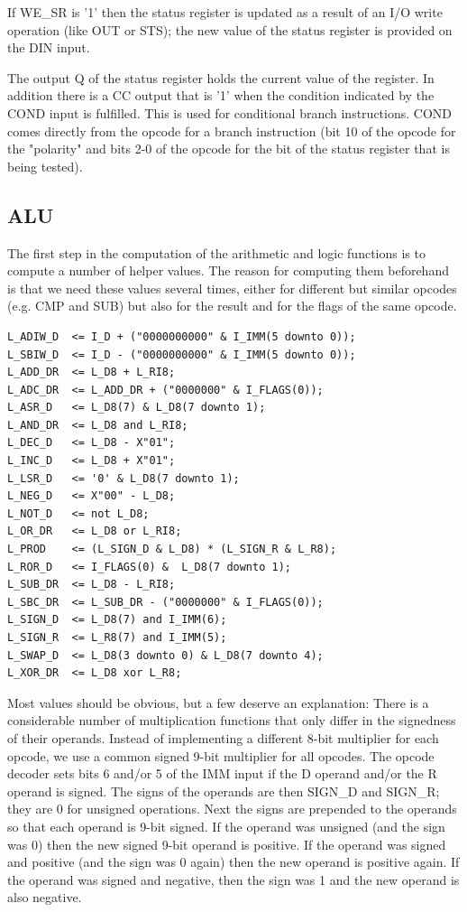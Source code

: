 \documentclass[12pt,a4paper]{report}
\begin{document}
If WE\_SR is '1' then the status register is updated as a result of an I/O write operation (like OUT or STS); the new value of the status register is provided on the DIN input.

The output Q of the status register holds the current value of the register. In addition there is a CC output that is '1' when the condition indicated by the COND input is fulfilled. This is used for conditional branch instructions. COND comes directly from the opcode for a branch instruction (bit 10 of the opcode for the "polarity" and bits 2-0 of the opcode for the bit of the status register that is being tested).
\subsection{ALU}
The first step in the computation of the arithmetic and logic functions is to compute a number of helper values. The reason for computing them beforehand is that we need these values several times, either for different but similar opcodes (e.g. CMP and SUB) but also for the result and for the flags of the same opcode.
\begin{lstlisting}
L_ADIW_D  <= I_D + ("0000000000" & I_IMM(5 downto 0));
L_SBIW_D  <= I_D - ("0000000000" & I_IMM(5 downto 0));
L_ADD_DR  <= L_D8 + L_RI8;
L_ADC_DR  <= L_ADD_DR + ("0000000" & I_FLAGS(0));
L_ASR_D   <= L_D8(7) & L_D8(7 downto 1);
L_AND_DR  <= L_D8 and L_RI8;
L_DEC_D   <= L_D8 - X"01";
L_INC_D   <= L_D8 + X"01";
L_LSR_D   <= '0' & L_D8(7 downto 1);
L_NEG_D   <= X"00" - L_D8;
L_NOT_D   <= not L_D8;
L_OR_DR   <= L_D8 or L_RI8;
L_PROD    <= (L_SIGN_D & L_D8) * (L_SIGN_R & L_R8);
L_ROR_D   <= I_FLAGS(0) &  L_D8(7 downto 1);
L_SUB_DR  <= L_D8 - L_RI8;
L_SBC_DR  <= L_SUB_DR - ("0000000" & I_FLAGS(0));
L_SIGN_D  <= L_D8(7) and I_IMM(6);
L_SIGN_R  <= L_R8(7) and I_IMM(5);
L_SWAP_D  <= L_D8(3 downto 0) & L_D8(7 downto 4);
L_XOR_DR  <= L_D8 xor L_R8;
\end{lstlisting}
Most values should be obvious, but a few deserve an explanation: There is a considerable number of multiplication functions that only differ in the signedness of their operands. Instead of implementing a different 8-bit multiplier for each opcode, we use a common signed 9-bit multiplier for all opcodes. The opcode decoder sets bits 6 and/or 5 of the IMM input if the D operand and/or the R operand is signed. The signs of the operands are then SIGN\_D and SIGN\_R; they are 0 for unsigned operations. Next the signs are prepended to the operands so that each operand is 9-bit signed. If the operand was unsigned (and the sign was 0) then the new signed 9-bit operand is positive. If the operand was signed and positive (and the sign was 0 again) then the new operand is positive again. If the operand was signed and negative, then the sign was 1 and the new operand is also negative.\\
\end{document}
